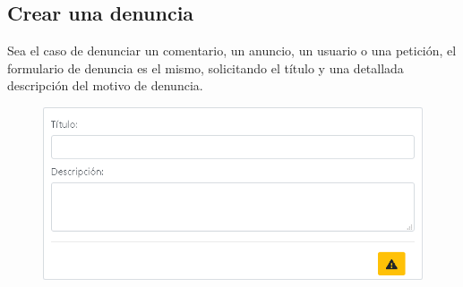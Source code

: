 \subsection{Crear una denuncia}
Sea el caso de denunciar un comentario, un anuncio, un usuario o una petici\'{o}n, el formulario de denuncia es el mismo, solicitando el t\'{i}tulo y una detallada descripci\'{o}n del motivo de denuncia. 

\begin{figure}[h!]
\centering
\includegraphics[width=.6\textwidth]{Img/ManualUsuario/DENUNCIA.png}
\end{figure}




